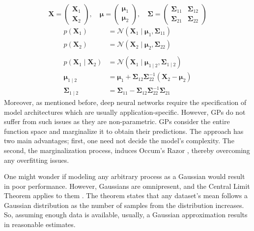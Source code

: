\documentclass[letterpaper,11pt]{extarticle}
\begin{document}
$$
\mathbf{X}=\left(\begin{array}{l}
\mathbf{X}_{1} \\
\mathbf{X}_{2}
\end{array}\right), \quad \boldsymbol{\mu}=\left(\begin{array}{l}
\boldsymbol{\mu}_{1} \\
\boldsymbol{\mu}_{2}
\end{array}\right), \quad \boldsymbol{\Sigma}=\left(\begin{array}{ll}
\boldsymbol{\Sigma}_{11} & \boldsymbol{\Sigma}_{12} \\
\boldsymbol{\Sigma}_{21} & \boldsymbol{\Sigma}_{22}
\end{array}\right)
$$
$$
\begin{aligned}
p\left(\mathbf{X}_{1}\right) &=\mathcal{N}\left(\mathbf{X}_{1} \mid \boldsymbol{\mu}_{1}, \boldsymbol{\Sigma}_{11}\right) \\
p\left(\mathbf{X}_{2}\right) &=\mathcal{N}\left(\mathbf{X}_{2} \mid \boldsymbol{\mu}_{2}, \mathbf{\Sigma}_{22}\right) \\ \\
p\left(\mathbf{X}_{1} \mid \mathbf{X}_{2}\right) &=\mathcal{N}\left(\mathbf{X}_{1} \mid \boldsymbol{\mu}_{1 \mid 2}, \boldsymbol{\Sigma}_{1 \mid 2}\right) \\
\boldsymbol{\mu}_{1 \mid 2} &=\boldsymbol{\mu}_{1}+\boldsymbol{\Sigma}_{12} \boldsymbol{\Sigma}_{22}^{-1}\left(\mathbf{X}_{2}-\boldsymbol{\mu}_{2}\right) \\
\boldsymbol{\Sigma}_{1 \mid 2} &=\boldsymbol{\Sigma}_{11}-\boldsymbol{\Sigma}_{12} \boldsymbol{\Sigma}_{22}^{-1} \boldsymbol{\Sigma}_{21}
\end{aligned}
$$
Moreover, as mentioned before, deep neural networks require the specification of model architectures which are usually application-specific.  However, GPs do not suffer from such issues as they are non-parametric. GPs consider the entire function space and marginalize it to obtain their predictions. The approach has two main advantages; first, one need not decide the model's complexity. The second, the marginalization process, induces Occum's Razor \cite{RasmussenW06}, thereby overcoming any overfitting issues. 
 
One might wonder if modeling any arbitrary process as a Gaussian would result in poor performance. However, Gaussians are omnipresent, and the Central Limit Theorem applies to them  \cite{RasmussenW06}. The theorem states that any dataset's mean follows a Gaussian distribution as the number of samples from the distribution increases. So, assuming enough data is available, usually, a Gaussian approximation results in reasonable estimates. 
\end{document}
